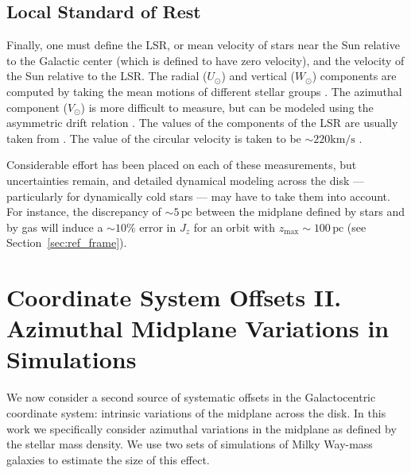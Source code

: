 \documentclass[twocolumn]{aastex62}
\newcommand{\pc}{\text{pc}}
\newcommand{\kms}{\text{km}/\text{s}}
\begin{document}
\subsection{Local Standard of Rest}
Finally, one must define the LSR, or mean velocity of stars near the Sun
relative to the Galactic center (which is defined to have zero velocity), and
the velocity of the Sun relative to the LSR. The radial ($U_{\odot}$) and
vertical ($W_{\odot}$) components are computed by taking the mean motions of
different stellar groups \citep[e.g.][]{2012MNRAS.427..274S}. The azimuthal
component ($V_{\odot}$) is more difficult to measure, but can be modeled using
the asymmetric drift relation \citep{2008gady.book.....B}. The values of the
components of the LSR are usually taken from \citet{2010MNRAS.403.1829S}. The
value of the circular velocity is taken to be $\sim 220\kms$
\citep[e.g.][]{2012ApJ...759..131B}.

\vspace{6pt}

Considerable effort has been placed on each of these measurements, but
uncertainties remain, and detailed dynamical modeling across the disk ---
particularly for dynamically cold stars --- may have to take them into
account. For instance, the discrepancy of $\sim 5\,\pc$ between the midplane
defined by stars and by gas will induce a $\sim10\%$ error in $J_z$ for an
orbit with $z_{\text{max}}\sim100\,\pc$ (see Section~\ref{sec:ref_frame}).

\section{Coordinate System Offsets II. Azimuthal Midplane Variations in
Simulations}
\label{sec:local_fire}

We now consider a second source of systematic offsets in the Galactocentric
coordinate system: intrinsic variations of the midplane across the disk. In
this work we specifically consider azimuthal variations in the midplane as
defined by the stellar mass density. We use two sets of simulations of Milky
Way-mass galaxies to estimate the size of this effect.
\end{document}
